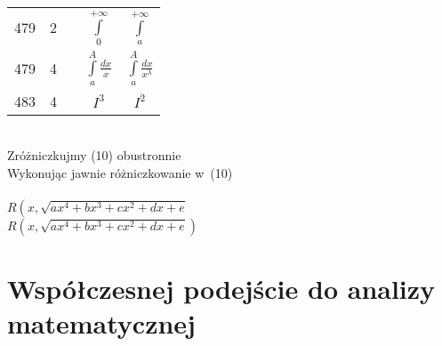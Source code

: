 \documentclass[a4paper,11pt]{article}
\begin{document}
\begin{center}
\begin{tabular}{|c|c|c|c|c|}
           479 & 2 & & $\int\limits_{ 0 }^{ +\infty }$
           & $\int\limits_{ a }^{ +\infty }$ \\[0.8em]
           479 & 4 & & $\int\limits_{ a }^{ A } \frac{ dx }{ x }$
           & $\int\limits_{ a }^{ A } \frac{ dx }{ x^{ \lambda } }$ \\[0.5em]
           483 & 4 & & $I^{ 3 }$ & $I^{ 2 }$ \\
    \hline
  \end{tabular}

\end{center}


\noindent
{} \\
\Jest  Zróżniczkujmy (10) obustronnie \\
\Powin Wykonując jawnie różniczkowanie w~(10) \\
 \\
\Jest  $R\left( x, \sqrt{ a x^{ 4 } + b x^{ 3 } + c x^{ 2 } + d x + e }
\right.$ \\
\Powin $R\left( x, \sqrt{ a x^{ 4 } + b x^{ 3 } + c x^{ 2 } + d x + e }
\right)$ \\

\vspace{\spaceTwo}










\section{Współczesnej podejście do analizy matematycznej}

\vspace{\spaceTwo}



\end{document}
